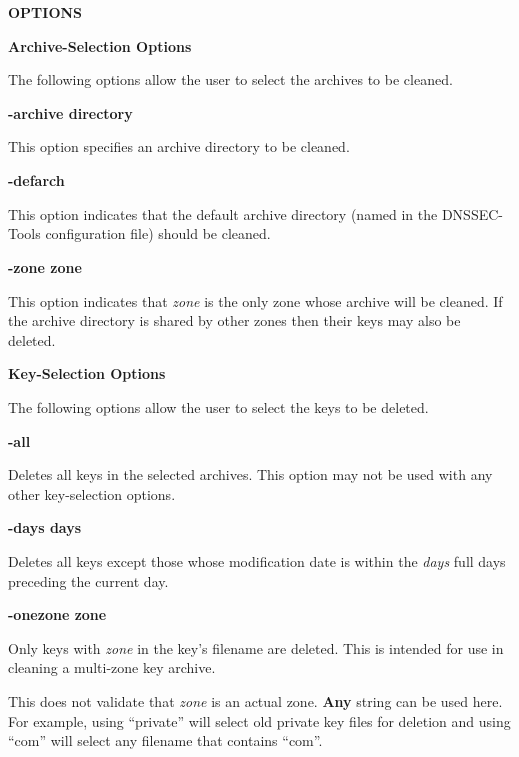 {\bf OPTIONS}

{\bf Archive-Selection Options}

The following options allow the user to select the archives to be cleaned.

\begin{description}

\item {\bf -archive directory}\verb" "

This option specifies an archive directory to be cleaned.

\item {\bf -defarch}\verb" "

This option indicates that the default archive directory (named in the
DNSSEC-Tools configuration file) should be cleaned. 

\item {\bf -zone zone}\verb" "

This option indicates that {\it zone} is the only zone whose archive will be
cleaned.  If the archive directory is shared by other zones then their keys
may also be deleted.

\end{description}

{\bf Key-Selection Options}

The following options allow the user to select the keys to be deleted.

\begin{description}

\item {\bf -all}\verb" "

Deletes all keys in the selected archives.
This option may not be used with any other key-selection options.

\item {\bf -days days}\verb" "

Deletes all keys except those whose modification date is within the
{\it days} full days preceding the current day.

\item {\bf -onezone zone}\verb" "

Only keys with {\it zone} in the key's filename are deleted.
This is intended for use in cleaning a multi-zone key archive.

This does not validate that {\it zone} is an actual zone.  {\bf Any} string
can be used here.  For example, using ``private'' will select old private key
files for deletion and using ``com'' will select any filename that contains
``com''.

\end{description}

